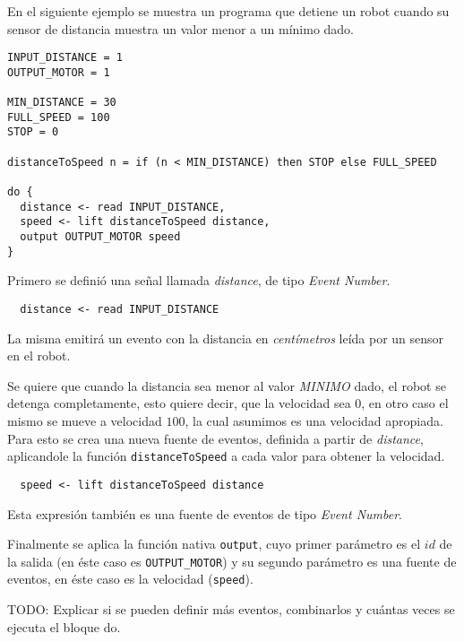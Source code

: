   En el siguiente ejemplo se muestra un programa \frob{} que detiene un
robot cuando su sensor de distancia muestra un valor menor a un mínimo dado.

\begin{verbatim}
INPUT_DISTANCE = 1
OUTPUT_MOTOR = 1

MIN_DISTANCE = 30
FULL_SPEED = 100
STOP = 0

distanceToSpeed n = if (n < MIN_DISTANCE) then STOP else FULL_SPEED

do {
  distance <- read INPUT_DISTANCE,
  speed <- lift distanceToSpeed distance,
  output OUTPUT_MOTOR speed
}

\end{verbatim}

Primero se definió una señal llamada \emph{distance},
de tipo \emph{Event Number}.

\begin{verbatim}
  distance <- read INPUT_DISTANCE
\end{verbatim}

  La misma emitirá un evento con la distancia en \emph{centímetros} leída
por un sensor en el robot.

  Se quiere que cuando la distancia sea menor al valor
\emph{MINIMO} dado, el robot se detenga completamente, esto
quiere decir, que la velocidad sea $0$, en otro caso el mismo
se mueve a velocidad $100$, la cual asumimos es una velocidad
apropiada.
  Para esto se crea una nueva fuente de eventos, definida a partir
de \emph{distance}, aplicandole la función \texttt{distanceToSpeed} 
a cada valor para obtener la velocidad.

\begin{verbatim}
  speed <- lift distanceToSpeed distance
\end{verbatim}

  Esta expresión también es una fuente de eventos
de tipo \emph{Event Number}.

  Finalmente se aplica la función nativa \texttt{output}, cuyo
primer parámetro es el $id$ de la salida (en éste caso 
es \texttt{OUTPUT\_MOTOR}) y su segundo parámetro es una
fuente de eventos, en éste caso es la velocidad (\texttt{speed}).

TODO: Explicar si se pueden definir más eventos, combinarlos y cuántas veces
se ejecuta el bloque do.
